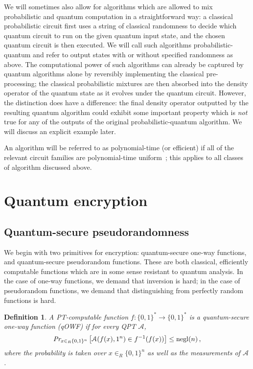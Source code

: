\documentclass[11pt]{article}
\numberwithin{equation}{section}
\newtheorem{definition}{Definition}
\newcommand{\opn}{\operatorname}
\newcommand{\algo}{\mathcal}
\newcommand{\negl}{\opn{negl}}
\newcommand{\inrand}{\in_R}
\begin{document}
We will sometimes also allow for algorithms which are allowed to mix probabilistic and quantum computation in a straightforward way: a classical probabilistic circuit first uses a string of classical randomness to decide which quantum circuit to run on the given quantum input state, and the chosen quantum circuit is then executed. We will call such algorithms probabilistic-quantum and refer to output states with or without specified randomness as above. The computational power of such algorithms can already be captured by quantum algorithms alone by reversibly implementing the classical pre-processing; the classical probabilistic mixtures are then absorbed into the density operator of the quantum state as it evolves under the quantum circuit. However, the distinction does have a difference: the final density operator outputted by the resulting quantum algorithm could exhibit some important property which is \emph{not} true for any of the outputs of the original probabilistic-quantum algorithm. We will discuss an explicit example later.

An algorithm will be referred to as polynomial-time (or efficient) if all of the relevant circuit families are polynomial-time uniform~\cite{ccreference}; this applies to all classes of algorithm discussed above.


\section{Quantum encryption}\label{sec:encryption}

\subsection{Quantum-secure pseudorandomness}

We begin with two primitives for encryption: quantum-secure one-way functions, and quantum-secure pseudorandom functions. These are both classical, efficiently computable functions which are in some sense resistant to quantum analysis. In the case of one-way functions, we demand that inversion is hard; in the case of pseudorandom functions, we demand that distinguishing from perfectly random functions is hard.

\begin{definition}\label{def:quantum-secure-owf}
A PT-computable function $f:\{0,1\}^* \rightarrow \{0, 1\}^*$ is a quantum-secure one-way function (qOWF) if for every QPT $\algo A$, 
$$
\emph{Pr}_{x \inrand \{0, 1\}^n} \left[\algo A (f(x), 1^n) \in f^{-1}(f(x)) \right] \leq \negl(n)\,,
$$
where the probability is taken over $x \inrand \{0, 1\}^n$ as well as the measurements of $\algo A$.
\end{definition}
\end{document}

